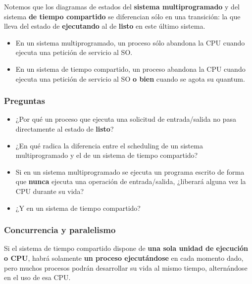 \documentclass[spanish,A4,]{article}
\begin{document}
Notemos que los diagramas de estados del \textbf{sistema
multiprogramado} y del sistema \textbf{de tiempo compartido} se
diferencian sólo en una transición: la que lleva del estado de
\textbf{ejecutando} al de \textbf{listo} en este último sistema.

\begin{itemize}
\itemsep1pt\parskip0pt
\item
  En un sistema multiprogramado, un proceso sólo abandona la CPU cuando
  ejecuta una petición de servicio al SO.
\item
  En un sistema de tiempo compartido, un proceso abandona la CPU cuando
  ejecuta una petición de servicio al SO \textbf{o bien} cuando se agota
  su quantum.
\end{itemize}

\subsubsection{Preguntas}\label{preguntas-1}

\begin{itemize}
\itemsep1pt\parskip0pt
\item
  ¿Por qué un proceso que ejecuta una solicitud de entrada/salida no
  pasa directamente al estado de \textbf{listo}?
\item
  ¿En qué radica la diferencia entre el scheduling de un sistema
  multiprogramado y el de un sistema de tiempo compartido?
\item
  Si en un sistema multiprogramado se ejecuta un programa escrito de
  forma que \textbf{nunca} ejecuta una operación de entrada/salida,
  ¿liberará alguna vez la CPU durante su vida?
\item
  ¿Y en un sistema de tiempo compartido?
\end{itemize}

\subsubsection{Concurrencia y
paralelismo}\label{concurrencia-y-paralelismo}

Si el sistema de tiempo compartido dispone de \textbf{una sola unidad de
ejecución o CPU}, habrá solamente \textbf{un proceso ejecutándose} en
cada momento dado, pero muchos procesos podrán desarrollar su vida al
mismo tiempo, alternándose en el uso de esa CPU.
\end{document}
